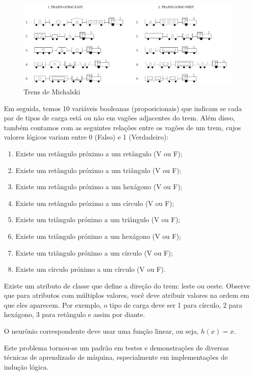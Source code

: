 \documentclass[12pt]{article}
\begin{document}
    \begin{figure}[h]
        \centering
        \includegraphics[width=0.9\linewidth]{michalskitrain.png}
        \caption{Trens de Michalski}
        \label{fig:trensmichalski}
    \end{figure}
    Em seguida, temos 10 variáveis booleanas (proposicionais) que indicam se cada par de tipos de carga está ou não em vagões adjacentes do trem. Além disso, também contamos com as seguintes relações entre os vagões de um trem, cujos valores lógicos variam entre 0 (Falso) e 1 (Verdadeiro):
    \begin{enumerate}
        \item Existe um retângulo próximo a um retângulo (V ou F);
        \item Existe um retângulo próximo a um triângulo (V ou F);
        \item Existe um retângulo próximo a um hexágono (V ou F);
        \item Existe um retângulo próximo a um círculo (V ou F);
        \item Existe um triângulo próximo a um triângulo (V ou F);
        \item Existe um triângulo próximo a um hexágono (V ou F);
        \item Existe um triângulo próximo a um círculo (V ou F);
        \item Existe um círculo próximo a um círculo (V ou F).
    \end{enumerate}

Existe um atributo de classe que define a direção do trem: leste ou oeste. Observe que para atributos com múltiplos valores, você deve atribuir valores na ordem em que eles aparecem. Por exemplo, o tipo de carga deve ser 1 para círculo, 2 para hexágono, 3 para retângulo e assim por diante.

O neurônio correspondente deve usar uma função linear, ou seja, $h(x) = x$.

Este problema tornou-se um padrão em testes e demonstrações de diversas técnicas de aprendizado de máquina, especialmente em implementações de indução lógica.
\end{document}
